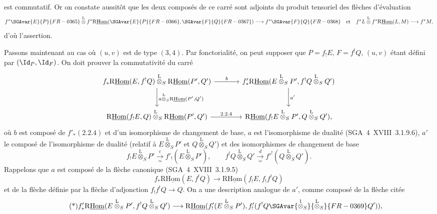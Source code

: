 est commutatif. Or on constate aussitôt que les deux composés de ce carré sont adjoints du produit tensoriel des flèches d'évaluation
\[
f^{*}\SGAvar{E}{P}{FR-0365}\overset{\mathrm{L}}{\otimes} f^{*}\mathrm{R}\underline{\mathrm{Hom}}(\SGAvar{E}{P}{FR-0366},\SGAvar{F}{Q}{FR-0367})\longrightarrow f^{*}\SGAvar{F}{Q}{FR-0368}
\quad\text{et}\quad
f^{*}L\overset{\mathrm{L}}{\otimes} f^{*}\mathrm{R}\underline{\mathrm{Hom}}(L,M)\longrightarrow f^{*}M,
\]
d'où l'assertion.

Passons maintenant au cas où $(u,v)$ est de type $(3,4)$. Par fonctorialité, on peut supposer que $P=f_{!}E$, $F=f^{!}Q$, $(u,v)$ étant défini par $(\Id_P,\Id_F)$. On doit prouver la commutativité du carré
\[
\begin{tikzcd}[
column sep=large,row sep=large]
f_*\mathrm{R}\underline{\mathrm{Hom}}(E,f^!Q)\overset{\mathrm{L}}{\otimes}_S\mathrm{R}\underline{\mathrm{Hom}}(P',Q') \arrow[r,"b"] \arrow[d,"{a\overset{\mathrm{L}}{\otimes}_S\mathrm{R}\underline{\mathrm{Hom}}(P',Q')}"] & f'_*\mathrm{R}\underline{\mathrm{Hom}}(E\overset{\mathrm{L}}{\otimes}_SP',f^!Q\overset{\mathrm{L}}{\otimes}_SQ') \arrow[d,"a'"]\\
\mathrm{R}\underline{\mathrm{Hom}}(f_!E,Q)\overset{\mathrm{L}}{\otimes}_S\mathrm{R}\underline{\mathrm{Hom}}(P',Q') \arrow[r,"2.2.4"] & \mathrm{R}\underline{\mathrm{Hom}}(f_!E\overset{\mathrm{L}}{\otimes}_SP',Q\overset{\mathrm{L}}{\otimes}_SQ'),
\end{tikzcd}
\]
où $b$ est composé de $f'_*(2.2.4)$ et d'un isomorphisme de changement de base, $a$ est l'isomorphisme de dualité (SGA~4~XVIII~3.1.9.6), $a'$ le composé de l'isomorphisme de dualité (relatif à $E\overset{\mathrm{L}}{\otimes}_SP'$ et $Q\overset{\mathrm{L}}{\otimes}_SQ'$) et des isomorphismes de changement de base
\[
f_!E\overset{\mathrm{L}}{\otimes}_SP'\xrightarrow[\simeq]{c}f'_!(E\overset{\mathrm{L}}{\otimes}_SP'),
\qquad
f^!Q\overset{\mathrm{L}}{\otimes}_SQ'\xrightarrow[\simeq]{d}f'^!(Q\overset{\mathrm{L}}{\otimes}_SQ').
\]
Rappelons que $a$ est composé de la flèche canonique (SGA~4~XVIII~3.1.9.5)
\[
f_*\mathrm{R}\underline{\mathrm{Hom}}(E,f^!Q)\longrightarrow\mathrm{R}\underline{\mathrm{Hom}}(f_!E,f_!f^!Q)
\]
et de la flèche définie par la flèche d'adjonction $f_!f^!Q\to Q$. On a une description analogue de $a'$, comme composé de la flèche citée
\begin{equation}\tag{*}
f'_*\mathrm{R}\underline{\mathrm{Hom}}(E\overset{\mathrm{L}}{\otimes}_SP',f^!Q\overset{\mathrm{L}}{\otimes}_SQ')\longrightarrow
\mathrm{R}\underline{\mathrm{Hom}}(f'_!(E\overset{\mathrm{L}}{\otimes}_SP'),f'_!(f^!Q\SGAvar{\overset{1}{\otimes}_S}{\overset{\mathrm{L}}{\otimes}_S}{FR-0369}Q')),
\end{equation}
